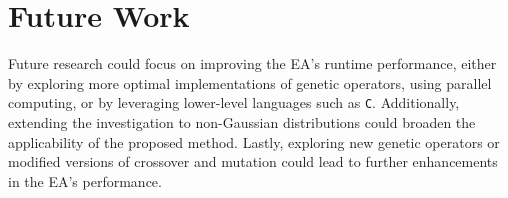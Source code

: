 \documentclass[12pt]{report}
\begin{document}
\section{Future Work}
Future research could focus on improving the EA's runtime performance, either by exploring more optimal implementations of genetic operators, using parallel computing, or by leveraging lower-level languages such as \texttt{C}. Additionally, extending the investigation to non-Gaussian distributions could broaden the applicability of the proposed method. Lastly, exploring new genetic operators or modified versions of crossover and mutation could lead to further enhancements in the EA's performance.




\cleardoublepage
{}
{}


 
\end{document}
